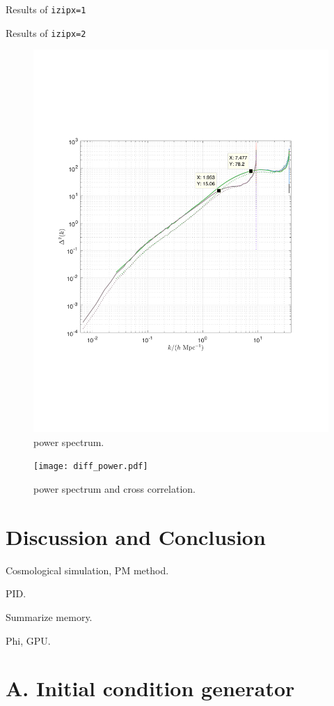 \documentclass[10pt,twocolumn,preprint]{emulateapj}
\begin{document}
Results of {\tt izipx=1}

Results of {\tt izipx=2}

\begin{figure}
\centering
  \includegraphics[width=0.95\linewidth]{power_universe1-8_z0and1.pdf}
 \caption{power spectrum.}
\label{fig.power}
\end{figure}


\begin{figure}
\centering
  \texttt{[image: diff\_power.pdf]}
 \caption{power spectrum and cross correlation.}
\label{fig.ccc}
\end{figure}

\section{Discussion and Conclusion}\label{s.discussion}
Cosmological simulation, PM method.

PID.

Summarize memory.

Phi, GPU.


\clearpage

\appendix

\section{A. Initial condition generator}


\acknowledgements



\end{document}
